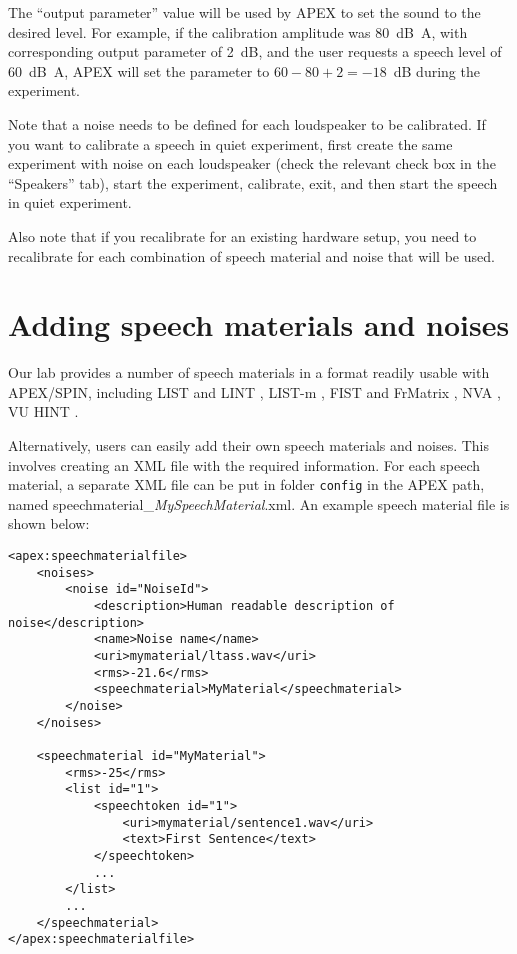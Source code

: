 {The ``output parameter'' value will be used by APEX to set the sound to
the desired level. For example, if the calibration amplitude was 80~dB~A, with
corresponding output parameter of 2~dB, and the user requests a speech
level of 60~dB~A, APEX will set the parameter to $60-80+2=-18$~dB during
the experiment.

Note that a noise needs to be defined for each loudspeaker to be
calibrated. If you want to calibrate a speech in quiet experiment, first
create the same experiment with noise on each loudspeaker (check the
relevant check box in the ``Speakers'' tab), start the experiment,
calibrate, exit, and then start the speech in quiet experiment.

Also note that if you recalibrate for an existing hardware setup, you
need to recalibrate for each combination of speech material and noise
that will be used.


\section {Adding speech materials and
noises}
\label{sec:Adding-speech-materials-and-noises}


Our lab provides a number of speech materials in a format readily usable
with APEX/SPIN, including LIST and LINT \citep{VanWieringen2008a},
LIST-m \citep{Jansen2014}, FIST \citep{Luts2008} and FrMatrix
\citep{Jansen2012}, NVA \citep{Wouters1994}, VU \citep{Versfeld2000}
HINT \citep{pm8132902}.

Alternatively, users can easily add their own speech materials and
noises. This involves creating an XML file with the required
information. For each speech material, a separate XML file can be put in
folder \texttt{config} in the APEX path, named
speechmaterial\_\emph{MySpeechMaterial}.xml. An example speech material
file is shown below:

\begin{lstlisting}[caption=Adding a speech material and noise]
<apex:speechmaterialfile>
    <noises>
        <noise id="NoiseId">
            <description>Human readable description of noise</description>
            <name>Noise name</name>
            <uri>mymaterial/ltass.wav</uri>
            <rms>-21.6</rms>
            <speechmaterial>MyMaterial</speechmaterial>
        </noise>
    </noises>
    
    <speechmaterial id="MyMaterial">
        <rms>-25</rms>
        <list id="1">
            <speechtoken id="1">
                <uri>mymaterial/sentence1.wav</uri>
                <text>First Sentence</text>
            </speechtoken>
            ...
        </list>
        ...
    </speechmaterial>
</apex:speechmaterialfile>
\end{lstlisting}

}
